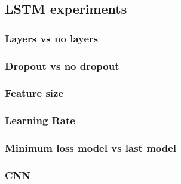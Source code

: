 \subsection{LSTM experiments}

\subsubsection{Layers vs no layers}


\subsubsection{Dropout vs no dropout}


\subsubsection{Feature size}


\subsubsection{Learning Rate}


\subsubsection{Minimum loss model vs last model} %
%

\subsubsection{CNN}
